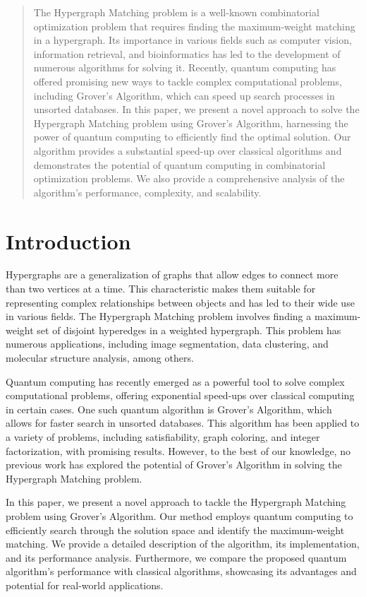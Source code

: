 \begin{abstract}
The Hypergraph Matching problem is a well-known combinatorial optimization problem that requires finding the maximum-weight matching in a hypergraph. Its importance in various fields such as computer vision, information retrieval, and bioinformatics has led to the development of numerous algorithms for solving it. Recently, quantum computing has offered promising new ways to tackle complex computational problems, including Grover's Algorithm, which can speed up search processes in unsorted databases. In this paper, we present a novel approach to solve the Hypergraph Matching problem using Grover's Algorithm, harnessing the power of quantum computing to efficiently find the optimal solution. Our algorithm provides a substantial speed-up over classical algorithms and demonstrates the potential of quantum computing in combinatorial optimization problems. We also provide a comprehensive analysis of the algorithm's performance, complexity, and scalability.

\end{abstract}

\section{Introduction}

Hypergraphs are a generalization of graphs that allow edges to connect more than two vertices at a time. This characteristic makes them suitable for representing complex relationships between objects and has led to their wide use in various fields. The Hypergraph Matching problem involves finding a maximum-weight set of disjoint hyperedges in a weighted hypergraph. This problem has numerous applications, including image segmentation, data clustering, and molecular structure analysis, among others.

Quantum computing has recently emerged as a powerful tool to solve complex computational problems, offering exponential speed-ups over classical computing in certain cases. One such quantum algorithm is Grover's Algorithm, which allows for faster search in unsorted databases. This algorithm has been applied to a variety of problems, including satisfiability, graph coloring, and integer factorization, with promising results. However, to the best of our knowledge, no previous work has explored the potential of Grover's Algorithm in solving the Hypergraph Matching problem.

In this paper, we present a novel approach to tackle the Hypergraph Matching problem using Grover's Algorithm. Our method employs quantum computing to efficiently search through the solution space and identify the maximum-weight matching. We provide a detailed description of the algorithm, its implementation, and its performance analysis. Furthermore, we compare the proposed quantum algorithm's performance with classical algorithms, showcasing its advantages and potential for real-world applications.

